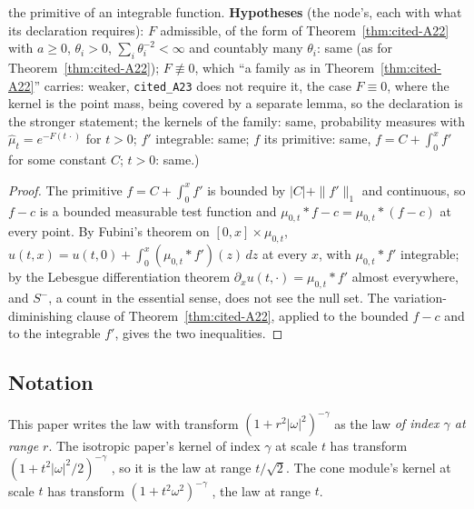 \begin{theorem}
{the primitive of an integrable function.
\textbf{Hypotheses} (the node's, each with what its declaration requires): $F$ admissible, of the form
of Theorem~\ref{thm:cited-A22} with $a \ge 0$, $\theta_i > 0$, $\sum_i\theta_i^{-2} < \infty$ and countably
many $\theta_i$: same (as for Theorem~\ref{thm:cited-A22}); $F \not\equiv 0$, which ``a family as in
Theorem~\ref{thm:cited-A22}'' carries: weaker, \texttt{cited\_A23} does not require it, the case
$F \equiv 0$, where the kernel is the point mass, being covered by a separate lemma, so the
declaration is the stronger statement; the kernels of the family: same, probability measures with
$\widehat\mu_t = e^{-F(t\,\cdot)}$ for $t > 0$; $f'$ integrable: same; $f$ its primitive: same,
$f = C + \int_0^x f'$ for some constant $C$; $t > 0$: same.)}
\end{theorem}

\begin{proof}
\leanok
{}
The primitive $f = C + \int_0^x f'$ is bounded by $|C| + \|f'\|_1$ and continuous, so
$f - c$ is a bounded measurable test function and $\mu_{0,t} * f - c = \mu_{0,t} * (f - c)$ at
every point. By Fubini's theorem on $[0, x] \times \mu_{0,t}$,
$u(t, x) = u(t, 0) + \int_0^x (\mu_{0,t} * f')(z)\,dz$ at every $x$, with $\mu_{0,t} * f'$ integrable;
by the Lebesgue differentiation theorem $\partial_x u(t,\cdot) = \mu_{0,t} * f'$ almost everywhere,
and $S^-$, a count in the essential sense, does not see the null set. The variation-diminishing
clause of Theorem~\ref{thm:cited-A22}, applied to the bounded $f - c$ and to the integrable $f'$,
gives the two inequalities.
\end{proof}

\subsection{Notation}
\label{subsec:cited-notation}

This paper writes the law with transform $(1 + r^2|\omega|^2)^{-\gamma}$ as the \Matern{} law
\emph{of index $\gamma$ at range $r$}. The isotropic paper's \Matern{} kernel of index $\gamma$ at
scale $t$ has transform $(1 + t^2|\omega|^2/2)^{-\gamma}$ ,
so it is the law at range $t/\sqrt2$. The cone module's \Matern{} kernel at scale $t$ has transform
$(1 + t^2\omega^2)^{-\gamma}$ , the law at range $t$.

